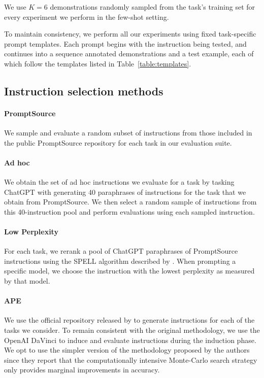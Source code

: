 We use $K=6$ demonstrations randomly sampled from the task's training set for every experiment we perform in the few-shot setting.

To maintain consistency, we perform all our experiments using fixed task-specific prompt templates. Each prompt begins with the instruction being tested, and continues into a sequence annotated demonstrations and a test example, each of which follow the templates listed in Table~\ref{table:templates}.




\subsection{Instruction selection methods}
\label{sec:baseline-implementation-details}

\paragraph{PromptSource} We sample and evaluate a random subset of instructions from those included in the public PromptSource repository for each task in our evaluation suite.

\paragraph{Ad hoc} We obtain the set of ad hoc instructions we evaluate for a task by tasking ChatGPT with generating 40 paraphrases of instructions for the task that we obtain from PromptSource. We then select a random sample of instructions from this 40-instruction pool and perform evaluations using each sampled instruction.

\paragraph{Low Perplexity} For each task, we rerank a pool of ChatGPT paraphrases of PromptSource instructions using the SPELL algorithm described by \cite{lowperplexityprompts}. When prompting a specific model, we choose the instruction with the lowest perplexity as measured by that model. 

\paragraph{APE} We use the official repository released by \cite{ape} to generate instructions for each of the tasks we consider. To remain consistent with the original methodology, we use the OpenAI DaVinci to induce and evaluate instructions during the induction phase. We opt to use the simpler version of the methodology proposed by the authors since they report that the computationally intensive Monte-Carlo search strategy only provides marginal improvements in accuracy.


